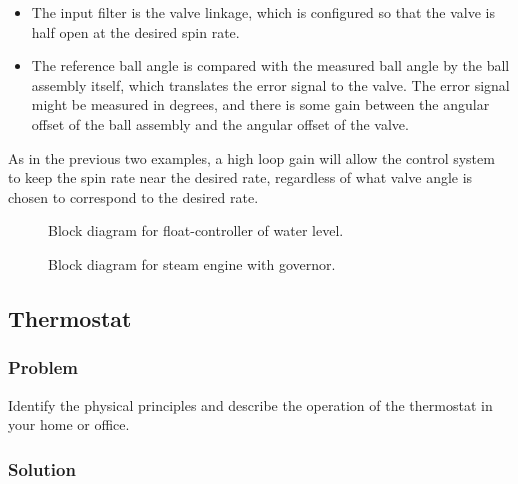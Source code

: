 \begin{enumerate}[(a)]
\begin{itemize}
         \item The input filter is the valve linkage, which is configured so
            that the valve is half open at the desired spin rate.
         \item The reference ball angle is compared with the measured ball
            angle by the ball assembly itself, which translates the error
            signal to the valve. The error signal might be measured in degrees,
            and there is some gain between the angular offset of the ball
            assembly and the angular offset of the valve.
      \end{itemize}
      As in the previous two examples, a high loop gain will allow the control
      system to keep the spin rate near the desired rate, regardless of what
      valve angle is chosen to correspond to the desired rate.
\end{enumerate}
\begin{figure}
   \begin{center}
      \begin{small}
         
      \end{small}
      \caption{Block diagram for float-controller of water level.}
      \label{fig:float-valve}
   \end{center}
\end{figure}
\begin{figure}
   \begin{center}
      \begin{small}
         
      \end{small}
      \caption{Block diagram for steam engine with governor.}
      \label{fig:steam-engine}
   \end{center}
\end{figure}

\subsection{Thermostat}

\subsubsection{Problem}

Identify the physical principles and describe the operation of the thermostat
in your home or office.

\subsubsection{Solution}

